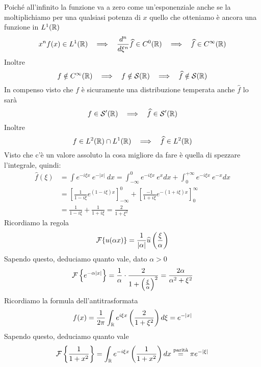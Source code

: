 Poiché all'infinito la funzione va a zero come un'esponenziale anche se la moltiplichiamo per una qualsiasi potenza di $x$ quello che otteniamo è ancora una funzione in $L^{1} (\mathbb{R})$
\begin{equation*}
x^{n} f(x)\in L^{1} (\RR)\ \ \implies \ \ \frac{d^{n}}{d\xi^{n}}\hat{f} \in C^{0}(\RR) \ \ \implies \ \ \hat{f} \in C^{\infty} (\RR)
\end{equation*}
Inoltre
\begin{equation*}
f\notin C^{\infty} (\mathbb{R})\ \ \implies \ \ f\notin \mathcal{S} (\mathbb{R}) \ \ \implies \ \ \widehat{f} \notin \mathcal{S} (\mathbb{R})
\end{equation*}
In compenso visto che $f$ è sicuramente una distribuzione temperata anche $\hat{f}$ lo sarà
\begin{equation*}
f\in \Sc'(\RR) \ \ \implies \ \ \hat{f} \in \Sc'(\RR)
\end{equation*}
Inoltre
\begin{equation*}
f\in L^{2}(\mathbb{R}) \cap L^{1}(\mathbb{R}) \ \ \implies \ \ \widehat{f} \in L^{2}(\mathbb{R})
\end{equation*}
Visto che c'è un valore assoluto la cosa migliore da fare è quella di spezzare l'integrale, quindi:
\begin{equation*}
\begin{aligned}
\hat{f} (\xi) & = \int e^{- i\xi x} \ e^{- |x|} \ dx = \int^{0}_{- \infty} e^{- i\xi x} \ e^{x} dx + \int^{+ \infty}_{0} e^{- i\xi x} \ e^{- x} dx\\
 & = \left[\frac{1}{1 - i\xi} e^{(1 - i\xi) x}\right]^{0}_{- \infty} + \left[\frac{- 1}{1 + i\xi} e^{- (1 + i\xi) x}\right]^{\infty}_{0}\\
 & = \frac{1}{1 - i\xi} + \frac{1}{1 + i\xi} = \frac{2}{1 + \xi^{2}}
\end{aligned}
\end{equation*}
Ricordiamo la regola
\begin{equation*}
\mathcal{F} \{u(\alpha x)\} = \frac{1}{| \alpha |}\widehat{u}\left(\frac{\xi}{\alpha}\right)
\end{equation*}
Sapendo questo, deduciamo quanto vale, dato $\alpha > 0$
\begin{equation*}
\mathcal{F} \left\{e^{- \alpha | x|}\right\} = \frac{1}{\alpha} \cdot \frac{2}{1 + \left(\frac{\xi}{\alpha}\right)^{2}} = \frac{2\alpha}{\alpha^{2} + \xi^{2}}
\end{equation*}
Ricordiamo la formula dell'antitrasformata
\begin{equation*}
f(x) = \frac{1}{2\pi}\int_{\mathbb{R}} e^{i\xi x}\left(\frac{2}{1 + \xi^{2}}\right) d\xi = e^{- |x|}
\end{equation*}
Sapendo questo, deduciamo quanto vale
\begin{equation*}
\mathcal{F} \left\{\frac{1}{1 + x^{2}}\right\} = \int_{\mathbb{R}} e^{- i\xi x}\left(\frac{1}{1 + x^{2}}\right) dx\overset{\text{parità}}{=} \pi e^{- | \xi |}
\end{equation*}

